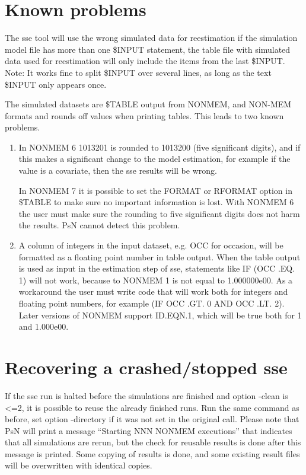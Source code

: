 \section{Known problems}
The sse tool will use the wrong simulated data for reestimation if the simulation model file has more than one \$INPUT statement, the table file with simulated data used for reestimation will only include the items from the last \$INPUT.
Note: It works fine to split \$INPUT over several lines, as long as the text \$INPUT only appears once.

The simulated datasets are \$TABLE output from NONMEM, and NON-MEM formats and rounds off values when printing tables. This leads to two known problems.

\begin{enumerate}
	\item In NONMEM 6 1013201 is rounded to 1013200 (five significant digits), and if this makes a significant change to the model estimation, for example if the value is a covariate, then the sse results will be wrong. 
	
	In NONMEM 7 it is possible to set the FORMAT or RFORMAT option in \$TABLE to make sure no important information is lost. With NONMEM 6 the user must make sure the rounding to five significant digits does not harm the results. PsN cannot detect this problem.

	\item A column of integers in the input dataset, e.g. OCC for occasion, will be formatted as a floating point number in table output. When the table output is used as input in the estimation step of sse, statements like IF (OCC .EQ. 1) will not work, because to NONMEM 1 is not equal to 1.000000e00. As a workaround the user must write code that will work both for integers and floating point numbers, for example (IF OCC .GT. 0 AND OCC .LT. 2). Later versions of NONMEM support ID.EQN.1, which will be true both for 1 and 1.000e00.
\end{enumerate}

\section{Recovering a crashed/stopped sse}
If the sse run is halted before the simulations are finished and option -clean is <=2, it is possible to reuse the already finished runs. Run the same command as before, set option -directory if it was not set in the original call. Please note that PsN will print a message “Starting NNN NONMEM executions” that indicates that all simulations are rerun, but the check for reusable results is done after this message is printed. Some copying of results is done, and some existing result files will be overwritten with identical copies. 

